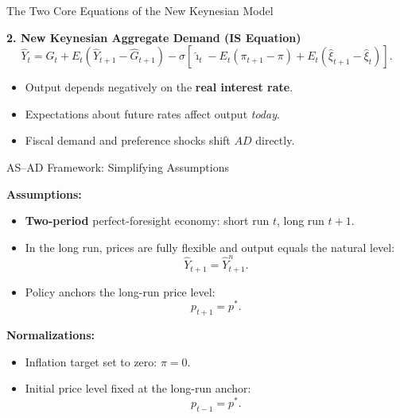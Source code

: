 \documentclass[11pt,aspectratio=169]{beamer}
\begin{document}
\begin{frame}{The Two Core Equations of the New Keynesian Model}
\small

\textbf{2. New Keynesian Aggregate Demand (IS Equation)}
\[
\hat{Y}_t =
\hat{G}_t
+
E_t(\hat{Y}_{t+1}-\hat{G}_{t+1})
-
\sigma\!\left[
\hat{\imath}_t - E_t(\pi_{t+1}-\pi)
+ E_t(\hat{\xi}_{t+1}-\hat{\xi}_t)
\right].
\]

\begin{itemize}
    \item Output depends negatively on the \textbf{real interest rate}.
    \item Expectations about future rates affect output \emph{today}.
    \item Fiscal demand and preference shocks shift $AD$ directly.
\end{itemize}

\end{frame}


\begin{frame}[label=ASADIntro]{AS–AD Framework: Simplifying Assumptions}
\small

\textbf{Assumptions:}
\begin{itemize}
\item \textbf{Two-period} perfect-foresight economy: short run $t$, long run $t+1$.
\item In the long run, prices are fully flexible and output equals the natural level:
\begin{equation*}
\hat{Y}_{t+1} = \hat{Y}_{t+1}^{n}.
\end{equation*}
\item Policy anchors the long-run price level:
\begin{equation*}
p_{t+1} = p^{*}.
\end{equation*}
\end{itemize}

\textbf{Normalizations:}
\begin{itemize}
\item Inflation target set to zero: $\pi = 0$.
\item Initial price level fixed at the long-run anchor:
\begin{equation*}
p_{t-1} = p^{*}.
\end{equation*}
\end{itemize}

\end{frame}
\end{document}
